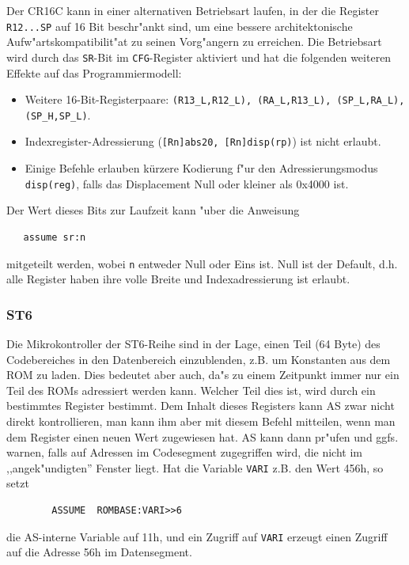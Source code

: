 \documentclass[12pt,a4paper,twoside]{report}
\newcommand{\tty}[1]{{\tt #1}}
\newcommand{\asname}{AS}
\begin{document}
Der CR16C kann in einer alternativen Betriebsart laufen, in der die Register
\tty{R12...SP} auf 16 Bit beschr"ankt sind, um eine bessere architektonische
Aufw"artskompatibilit"at zu seinen Vorg"angern zu erreichen.  Die Betriebsart
wird durch das \tty{SR}-Bit im \tty{CFG}-Register aktiviert und hat die folgenden
weiteren Effekte auf das Programmiermodell:
\begin{itemize}
\item{Weitere 16-Bit-Registerpaare: \tty{(R13\_L,R12\_L), (RA\_L,R13\_L),
      (SP\_L,RA\_L), (SP\_H,SP\_L)}.}
\item{Indexregister-Adressierung (\tty{[Rn]abs20, [Rn]disp(rp)}) ist
      nicht erlaubt.}
\item{Einige Befehle erlauben kürzere Kodierung f"ur den Adressierungsmodus
      \tty{disp(reg)}, falls das Displacement Null oder kleiner als 0x4000
      ist.}
\end{itemize}
Der Wert dieses Bits zur Laufzeit kann "uber die Anweisung
\begin{verbatim}
   assume sr:n
\end{verbatim}
mitgeteilt werden, wobei \tty{n} entweder Null oder Eins ist.  Null ist der
Default, d.h. alle Register haben ihre volle Breite und Indexadressierung
ist erlaubt.


\subsubsection{ST6}
\label{ST6Assume}

Die Mikrokontroller der ST6-Reihe sind in der Lage, einen Teil (64 Byte)
des Codebereiches in den Datenbereich einzublenden, z.B. um Konstanten aus
dem ROM zu laden.  Dies bedeutet aber auch, da"s zu einem Zeitpunkt immer
nur ein Teil des ROMs adressiert werden kann.  Welcher Teil dies ist, wird
durch ein bestimmtes Register bestimmt.  Dem Inhalt dieses Registers kann
\asname{} zwar nicht direkt kontrollieren, man kann ihm aber mit diesem Befehl
mitteilen, wenn man dem Register einen neuen Wert zugewiesen hat.  \asname{} kann
dann pr"ufen und ggfs. warnen, falls auf Adressen im Codesegment
zugegriffen wird, die nicht im ,,angek"undigten'' Fenster liegt.
Hat die Variable \tty{VARI} z.B. den Wert 456h, so setzt
\begin{verbatim}
        ASSUME  ROMBASE:VARI>>6
\end{verbatim}
die \asname{}-interne Variable auf 11h, und ein Zugriff auf \tty{VARI} erzeugt einen
Zugriff auf die Adresse 56h im Datensegment.
\end{document}

